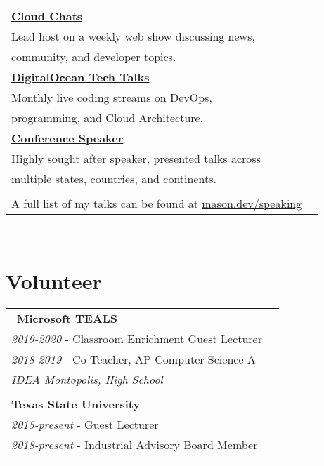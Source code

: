 \documentclass[10pt]{article} %
\newcommand\tab[1][1cm]{\hspace*{#1}}
\begin{document}
\begin{minipage}[t]{0.44\textwidth}
\begin{tabular}{ll}

\textbf{\href{https://www.digitalocean.com/community/pages/cloud-chats}{Cloud Chats}} \\
\tab Lead host on a weekly web show discussing news, \\
\tab community, and developer topics.\\

\textbf{\href{https://www.digitalocean.com/community/users/masonegger?subtype=tech_talk}{DigitalOcean Tech Talks}} \\
\tab Monthly live coding streams on DevOps, \\
\tab programming, and Cloud Architecture.\\

\textbf{\href{https://mason.dev/speaking}{Conference Speaker}} \\
\tab Highly sought after speaker, presented talks across \\ 
\tab multiple states, countries, and continents. \\
\\

A full list of my talks can be found at \href{https://mason.dev/speaking}{mason.dev/speaking}\\

\end{tabular}\\




\section{Volunteer} 

\begin{tabular}{ll}\
\textbf{Microsoft TEALS}\\
\tab\textit{2019-2020} - Classroom Enrichment Guest Lecturer\\
\tab\textit{2018-2019} - Co-Teacher, AP Computer Science A\\
\tab\tab\textit {IDEA Montopolis, High School}\\
\\

\textbf{Texas State University}\\
\tab\textit{2015-present} - Guest Lecturer\\
\tab\textit{2018-present} - Industrial Advisory Board Member\\
\\

\end{tabular}\\



    
\end{minipage} %
\end{document}
